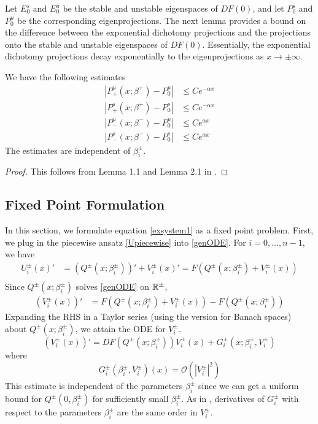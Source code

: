 \documentclass[thesis.tex]{subfiles}
\begin{document}
Let $E_0^s$ and $E_0^u$ be the stable and unstable eigenspaces of $DF(0)$, and let $P_0^s$ and $P_0^u$ be the corresponding eigenprojections. The next lemma provides a bound on the difference between the exponential dichotomy projections and the projections onto the stable and unstable eigenspaces of $DF(0)$. Essentially, the exponential dichotomy projections decay exponentially to the eigenprojections as $x \rightarrow \pm \infty$.


\begin{lemma}\label{projdifflemma}
We have the following estimates
\begin{equation}\label{projdiffest}
\begin{aligned}
|P^u_+(x; \beta^+) - P_0^u| &\leq C e^{-\alpha x} \\
|P^s_+(x; \beta^+) - P_0^s| &\leq C e^{-\alpha x} \\
|P^u_-(x; \beta^-) - P_0^u| &\leq C e^{\alpha x} \\
|P^s_-(x; \beta^-) - P_0^s| &\leq C e^{\alpha x} 
\end{aligned}
\end{equation}
The estimates are independent of $\beta_i^\pm$.
\begin{proof}
This follows from Lemma 1.1 and Lemma 2.1 in \cite{Sandstede1993}.
\end{proof}
\end{lemma}

\subsection{Fixed Point Formulation}

In this section, we formulate equation \eqref{exsystem1} as a fixed point problem. First, we plug in the piecewise ansatz \eqref{Upiecewise} into \eqref{genODE}. For $i = 0, \dots, n-1$, we have 
\begin{align*}
U_i^\pm(x)' &= (Q^\pm(x; \beta_i^\pm))' + V_i^\pm(x)' = F\left(Q^\pm(x; \beta_i^\pm) + V_i^\pm(x) \right) \\
\end{align*}
Since $Q^\pm(x; \beta_i^\pm)$ solves \eqref{genODE} on $\mathbb{R}^\pm$, 
\begin{align*}
(V_i^\pm(x))' &= F\left(Q^\pm(x; \beta_i^\pm) + V_i^\pm(x) \right) - F(Q^\pm(x; \beta_i^\pm))
\end{align*}
Expanding the RHS in a Taylor series (using the version for Banach spaces) about $Q^\pm(x; \beta_i^\pm)$, we attain the ODE for $V_i^\pm$.
\begin{equation}\label{Vpiecewise}
(V_i^\pm(x))' = DF(Q^\pm(x; \beta_i^\pm)) V_i^\pm(x) + G_i^\pm(x; \beta_i^\pm, V_i^\pm)
\end{equation}
where 
\begin{equation}\label{Gquadratic}
G_i^\pm(\beta_i^\pm, V_i^\pm)(x) = \mathcal{O}(|V_i^\pm|^2)
\end{equation}
This estimate is independent of the parameters $\beta_i^\pm$ since we can get a uniform bound for $Q^\pm(0, \beta_i^\pm)$ for sufficiently small $\beta_i^\pm$. As in \cite{Sandstede1997}, derivatives of $G_i^\pm$ with respect to the parameters $\beta_i^\pm$ are the same order in $V_i^\pm$.
\end{document}
